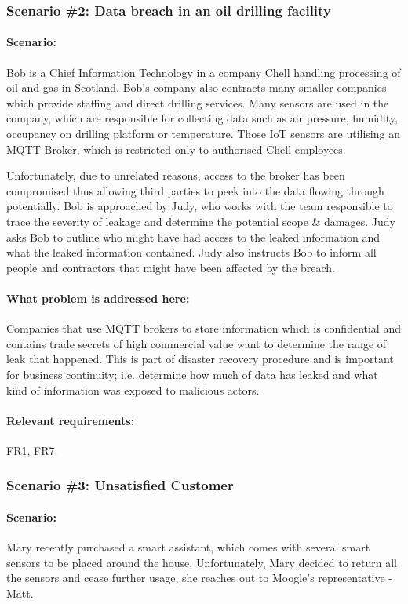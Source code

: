 \subsubsection{Scenario \#2: Data breach in an oil drilling facility}
\paragraph{\textbf{Scenario:}}
Bob is a Chief Information Technology in a company Chell handling processing of oil and gas in Scotland. Bob's company also contracts many smaller companies which provide staffing and direct drilling services. Many sensors are used in the company, which are responsible for collecting data such as air pressure, humidity, occupancy on drilling platform or temperature. Those IoT sensors are utilising an MQTT Broker, which is restricted only to authorised Chell employees.

Unfortunately, due to unrelated reasons, access to the broker has been compromised thus allowing third parties to peek into the data flowing through potentially. Bob is approached by Judy, who works with the team responsible to trace the severity of leakage and determine the potential scope \& damages. Judy asks Bob to outline who might have had access to the leaked information and what the leaked information contained. Judy also instructs Bob to inform all people and contractors that might have been affected by the breach.
\paragraph{\textbf{What problem is addressed here:}}
Companies that use MQTT brokers to store information which is confidential and contains trade secrets of high commercial value want to determine the range of leak that happened. This is part of disaster recovery procedure and is important for business continuity; i.e. determine how much of data has leaked and what kind of information was exposed to malicious actors.
\paragraph{\textbf{Relevant requirements:}} FR1, FR7.
\\
\subsubsection{Scenario \#3: Unsatisfied Customer}
\paragraph{\textbf{Scenario:}}
Mary recently purchased a smart assistant, which comes with several smart sensors to be placed around the house. Unfortunately, Mary decided to return all the sensors and cease further usage, she reaches out to Moogle's representative - Matt.

